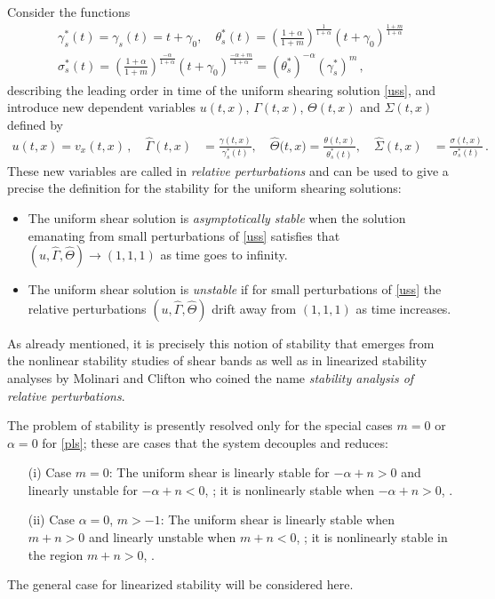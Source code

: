 \documentclass[a4paper,11pt]{article}
\theoremstyle{remark}
\begin{document}
Consider the  functions
\begin{equation}
\label{timescale}
\begin{aligned}
\gamma^*_s (t)  = \gamma_s (t)  = t + \gamma_0 , \quad
\theta^*_s (t)  =\left( \frac{1+\alpha}{1+m}\right)^{\frac{1}{1+\alpha}} (t + \gamma_0)^{\frac{1+m}{1+\alpha}}
\\
\sigma^*_s (t) = \left( \frac{1+\alpha}{1+m}\right)^{\frac{-\alpha}{1+\alpha}} (t + \gamma_0)^{\frac{-\alpha+m}{1+\alpha}}
= (\theta^*_s)^{-\alpha} (\gamma^*_s)^m \, ,
\end{aligned}
\end{equation}
describing the leading order in time of the uniform shearing solution \eqref{uss}, and introduce new dependent variables $u(t,x)$,
 $\Gamma (t, x)$, $\Theta (t,x)$ and $\Sigma(t,x)$ defined by
\begin{equation}
\label{rescale}
 \begin{aligned}
 u(t,x) = v_x (t,x) \, , \quad
  \hat \Gamma (t,x) &= \frac{\gamma(t,x)}{\gamma^*_s(t)}, \quad \hat\Theta\big(t,x\big)=\frac{\theta(t,x)}{\theta^*_s (t)}, \quad
  \hat\Sigma(t,x) &= \frac{\sigma(t,x)}{\sigma^*_s(t)} \, . \
   \end{aligned}
\end{equation}
These new variables are called in \cite{HN77,MC87,FM87}  {\it relative perturbations} and can be used to give a
precise the definition for the stability for the uniform shearing solutions:
\begin{itemize}
\item
The uniform shear solution is {\it asymptotically stable} when the solution emanating from small perturbations
of \eqref{uss} satisfies that $(u, \hat\Gamma, \hat\Theta) \to (1,1,1)$ as time goes to infinity.
\item
The uniform shear solution is {\it unstable} if for small perturbations of \eqref{uss} the relative perturbations
$(u, \hat\Gamma, \hat\Theta)$ drift away from $(1,1,1)$ as time increases.
\end{itemize}
As already mentioned, it is precisely this notion of stability that emerges from the nonlinear stability studies of shear bands \cite{DH83,Tzavaras86a} as well as
in linearized stability analyses by  Molinari and Clifton \cite{MC87,FM87}
who coined the name {\it stability analysis of relative perturbations}.

The problem of stability is presently resolved only for the special cases
$m=0$ or $\alpha = 0$ for \eqref{pls};  these are cases that the system decouples and reduces:%
\begin{itemize}
\item[(i)] Case $m=0$: The uniform shear is linearly stable for $-\alpha + n > 0$ and linearly unstable for $-\alpha + n < 0$, \cite{FM87};
it is nonlinearly stable when $-\alpha + n > 0$, \cite{Tzavaras86a}.
\item[(ii)] Case $\alpha =0$, $m > -1$: The uniform shear is linearly stable when $m + n > 0$ and linearly unstable when $m+ n < 0$, \cite{FM87,Tzavaras92};
it is nonlinearly stable in the region $m + n > 0$, \cite{Tzavaras91}.
\end{itemize}
The general case for linearized stability will be considered here.
\end{document}
